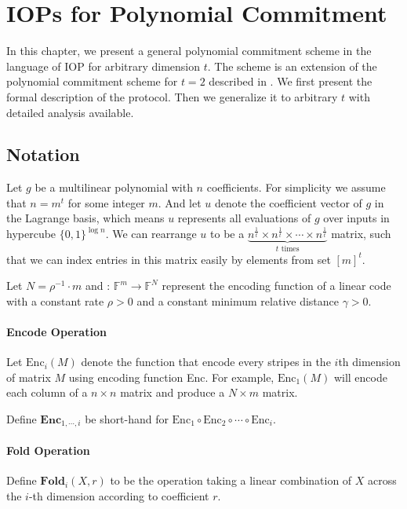 \chapter{IOPs for Polynomial Commitment}

In this chapter, we present a general polynomial commitment scheme in the language of IOP for arbitrary dimension $t$. The scheme is an extension of the polynomial commitment scheme for $t=2$ described in \cite{brakedown}. We first present the formal description of the protocol. Then we generalize it to arbitrary $t$ with detailed analysis available.

\section{Notation}

Let $g$ be a multilinear polynomial with $n$ coefficients. For simplicity we assume that $n = m^t$ for some integer $m$. And let $u$ denote the coefficient vector of $g$ in the Lagrange basis, which means $u$ represents all evaluations of $g$ over inputs in hypercube $\{0, 1\}^{\log n}$. 
We can rearrange $u$ to be a $\underbrace{n^{\frac{1}{t}} \times n^{\frac{1}{t}} \times \cdots \times n^{\frac{1}{t}}}_{t \text{ times}}$ matrix, such that we can index entries in this matrix easily by elements from set $[m]^t$.

Let $N = \rho^{-1} \cdot m$ and : $\mathbb{F}^m \rightarrow \mathbb{F}^N$ represent the encoding function of a linear code with a constant rate $\rho > 0$ and a constant minimum relative distance $\gamma > 0$.

\subsubsection{Encode Operation}

Let $\text{Enc}_i(M)$ denote the function that encode every stripes in the $i$th dimension of matrix $M$ using encoding function Enc. For example, $\text{Enc}_1(M)$ will encode each column of a $n \times n $ matrix and produce a $N \times m$ matrix.


Define $\textbf{Enc}_{1,\cdots,i}$ be short-hand for $\text{Enc}_1 \circ \text{Enc}_2 \circ \cdots \circ \text{Enc}_{i}$.

\subsubsection{Fold Operation}

Define $\textbf{Fold}_i(X, r)$ to be the operation taking a linear combination of $X$ across the $i$-th dimension according to coefficient $r$. 

